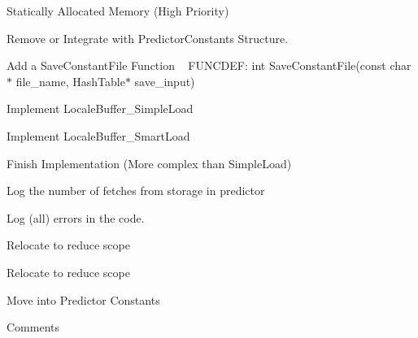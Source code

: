 \begin{DoxyRefList}
Statically Allocated Memory (High Priority)  
\item[Global \doxylink{predictor_8h_a4e6f06fbe7f6b462853492abfbd0bec2}{kC} ]\label{todo__todo000021}%
%
Remove or Integrate with Predictor\+Constants Structure.  
\item[File \doxylink{load__constants_8h}{load\+\_\+constants.h} ]\label{todo__todo000003}%
%
Add a Save\+Constant\+File Function ~\newline
FUNCDEF\+: int Save\+Constant\+File(const char\texorpdfstring{$\ast$}{*} file\+\_\+name, Hash\+Table\texorpdfstring{$\ast$}{*} save\+\_\+input)  
\item[File \doxylink{locale__buffer_8h}{locale\+\_\+buffer.h} ]\label{todo__todo000010}%
%
Implement Locale\+Buffer\+\_\+\+Simple\+Load 



Implement Locale\+Buffer\+\_\+\+Smart\+Load  
\item[Global \doxylink{locale__buffer_8h_aafe3d5c7c1f0f2b689902c0bf1f7e4eb}{Locale\+Buffer\+\_\+\+Smart\+Load} (\doxylink{struct_locale_buffer}{Locale\+Buffer} \texorpdfstring{$\ast$}{*}buf, image \texorpdfstring{$\ast$}{*}h\+IMG)]\label{todo__todo000011}%
%
Finish Implementation (More complex than Simple\+Load)  
\item[File \doxylink{logs_8h}{logs.h} ]\label{todo__todo000013}%
%
Log the number of fetches from storage in predictor 



Log (all) errors in the code.  
\item[Global \doxylink{math__functions_8h_adf11110e70a4ca4a966622288d194681}{Manhattan2} (\doxylink{structdim2}{dim2} pt1, \doxylink{structdim2}{dim2} pt2)]\label{todo__todo000018}%
%
Relocate to reduce scope  
\item[Global \doxylink{math__functions_8h_ace80df346398f6e153166e87cee41d47}{Manhattan3} (\doxylink{structdim3}{dim3} pt1, \doxylink{structdim3}{dim3} pt2)]\label{todo__todo000019}%
%
Relocate to reduce scope  
\item[Global \doxylink{sample__representative_8h_a0ed063d2db07cb63fecfb70cffec43f1}{offset} \mbox{[}\mbox{]}]\label{todo__todo000024}%
%
Move into Predictor Constants  
\item[File \doxylink{predictor__constants_8h}{predictor\+\_\+constants.h} ]\label{todo__todo000004}%
%
Comments 




\end{DoxyRefList}
